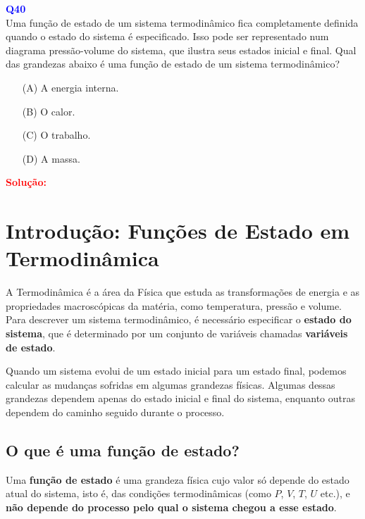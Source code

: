 \documentclass[a4paper,12pt]{article}
\begin{document}
\begin{flushleft}
\textbf{\textcolor{blue}{\Large Q40}}\\
\noindent
Uma função de estado de um sistema termodinâmico fica
completamente definida quando o estado do sistema é
especificado. Isso pode ser representado num diagrama
pressão-volume do sistema, que ilustra seus estados inicial
e final. Qual das grandezas abaixo é uma função de estado
de um sistema termodinâmico?

\begin{itemize}
\item[(A)] A energia interna.
\item[(B)] O calor.
\item[(C)] O trabalho.
\item[(D)] A massa.
\end{itemize}

\vspace{0.5cm}

\textcolor{red}{\textbf{Solução:}}\\

\section*{Introdução: Funções de Estado em Termodinâmica}

A Termodinâmica é a área da Física que estuda as transformações de energia e as propriedades macroscópicas da matéria, como temperatura, pressão e volume. Para descrever um sistema termodinâmico, é necessário especificar o \textbf{estado do sistema}, que é determinado por um conjunto de variáveis chamadas \textbf{variáveis de estado}.

Quando um sistema evolui de um estado inicial para um estado final, podemos calcular as mudanças sofridas em algumas grandezas físicas. Algumas dessas grandezas dependem apenas do estado inicial e final do sistema, enquanto outras dependem do caminho seguido durante o processo.

\subsection*{O que é uma função de estado?}

Uma \textbf{função de estado} é uma grandeza física cujo valor só depende do estado atual do sistema, isto é, das condições termodinâmicas (como \(P\), \(V\), \(T\), \(U\) etc.), e \textbf{não depende do processo pelo qual o sistema chegou a esse estado}.


\end{flushleft}
\end{document}
